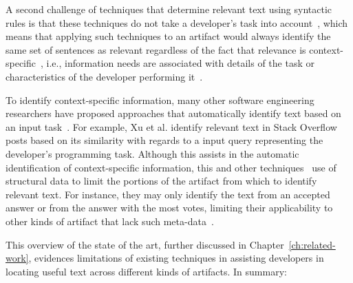 A second challenge of techniques that 
determine relevant text using syntactic rules is that 
these techniques do not take  a developer's task into account~\cite{Robillard2015}, which means that applying such 
techniques to an artifact would always identify 
the same set of sentences as relevant 
regardless of the fact that relevance is context-specific~\cite{Bavota2016}, i.e., information needs are associated with details of the task 
or characteristics of the developer performing it~\cite{Robillard2015}.


To identify context-specific information, 
many other software engineering researchers 
have proposed approaches that 
automatically identify text based on an input task~\cite{Ye2016, silva2019, Xu2017}.
For example, Xu et al. identify relevant text in Stack Overflow posts 
based on its similarity with regards to a input query representing the developer's programming task.
Although this assists in the automatic identification of context-specific information, 
this and other techniques~\cite{silva2019, Li2018}
use of structural data to limit the portions of the artifact from which to identify 
relevant text.
For instance, they may only identify the text from an accepted answer or from 
the answer with the most votes,  
limiting their applicability to other kinds of artifact  that lack such meta-data~\cite{Bavota2016, arnaoudova2015}.



  




This overview of the state of the art, further discussed in Chapter~\ref{ch:related-work}, evidences limitations of existing techniques 
in assisting developers in locating useful text across different kinds of artifacts.
In summary:

